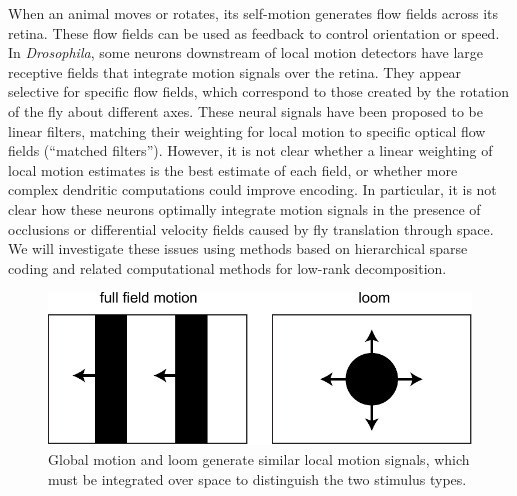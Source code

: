 When an animal moves or rotates, its
self-motion generates flow fields across its retina. These flow fields
can be used as feedback to control orientation or speed.
In \textit{Drosophila}, some neurons downstream of local motion
detectors have large receptive fields that integrate motion signals
over the retina. They appear selective for specific flow
fields, which correspond to those created by the rotation of
the fly about different axes. These neural signals have been proposed
to be linear filters, matching their weighting for local motion to
specific optical flow fields (``matched filters''). However, it is not
clear whether a linear weighting of local motion estimates is
the best estimate of each field, or whether more complex dendritic
computations could improve encoding. In particular, it is not clear
how these neurons optimally integrate motion signals in the
presence of occlusions or differential velocity fields 
caused by fly translation through space. We will investigate these
issues using methods based on hierarchical sparse coding 
\citep{Yu:2011} and related computational methods for
low-rank decomposition.


\setlength{\columnsep}{10pt}
\begin{figure}
\vskip-10pt
\centering
\includegraphics[width=.44\textwidth]{figs/loom}
\caption{\small Global motion and loom generate similar local
motion signals, which must be integrated over space
to distinguish the two stimulus types.}
    \label{fig:loom}
\vskip-20pt
\end{figure}

